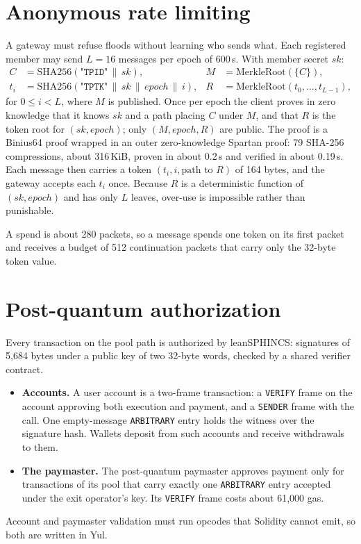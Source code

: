\documentclass[11pt,a4paper]{article}
\newcommand{\code}[1]{\texttt{\small #1}}
\begin{document}
\section{Anonymous rate limiting}

A gateway must refuse floods without learning who sends what. Each registered member may send $L = 16$
messages per epoch of 600\,s. With member secret $\mathit{sk}$:
\begin{align*}
  C &= \mathrm{SHA256}(\texttt{"TPID"} \,\|\, \mathit{sk}), & M &= \mathrm{MerkleRoot}(\{C\}), \\
  t_i &= \mathrm{SHA256}(\texttt{"TPTK"} \,\|\, \mathit{sk} \,\|\, \mathit{epoch} \,\|\, i), & R &= \mathrm{MerkleRoot}(t_0, \dots, t_{L-1}),
\end{align*}
for $0 \le i < L$, where $M$ is published.
Once per epoch the client proves in zero knowledge that it knows $\mathit{sk}$ and a path placing $C$
under $M$, and that $R$ is the token root for $(\mathit{sk}, \mathit{epoch})$; only $(M, \mathit{epoch}, R)$
are public. The proof is a Binius64 proof wrapped in an outer zero-knowledge Spartan proof: 79 SHA-256
compressions, about 316\,KiB, proven in about 0.2\,s and verified in about 0.19\,s. Each message then
carries a token $(t_i, i, \text{path to } R)$ of 164 bytes, and the gateway accepts each $t_i$ once.
Because $R$ is a deterministic function of $(\mathit{sk}, \mathit{epoch})$ and has only $L$ leaves, over-use
is impossible rather than punishable.

A spend is about 280 packets, so a message spends one token on its first packet and receives a budget of
512 continuation packets that carry only the 32-byte token value.

\section{Post-quantum authorization}

Every transaction on the pool path is authorized by leanSPHINCS: signatures of 5,684 bytes under a public
key of two 32-byte words, checked by a shared verifier contract.
\begin{itemize}
  \item \textbf{Accounts.} A user account is a two-frame transaction: a \code{VERIFY} frame on the account
    approving both execution and payment, and a \code{SENDER} frame with the call. One empty-message
    \code{ARBITRARY} entry holds the witness over the signature hash. Wallets deposit from such accounts
    and receive withdrawals to them.
  \item \textbf{The paymaster.} The post-quantum paymaster approves payment only for transactions of its
    pool that carry exactly one \code{ARBITRARY} entry accepted under the exit operator's key. Its
    \code{VERIFY} frame costs about 61,000 gas.
\end{itemize}
Account and paymaster validation must run opcodes that Solidity cannot emit, so both are written in Yul.
\end{document}
